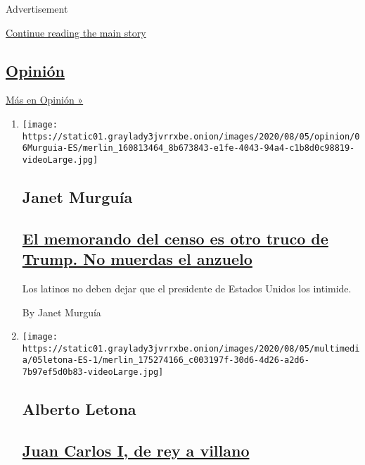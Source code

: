 Advertisement

\protect\hyperlink{after-mid1}{Continue reading the main story}

\hypertarget{opiniuxf3n}{%
\subsection{\texorpdfstring{\href{/es/section/opinion}{Opinión}}{Opinión}}\label{opiniuxf3n}}

\href{/es/section/opinion}{Más en Opinión »}

\begin{enumerate}
\def\labelenumi{\arabic{enumi}.}
\item
  \texttt{[image: https://static01.graylady3jvrrxbe.onion/images/2020/08/05/opinion/06Murguia-ES/merlin\_160813464\_8b673843-e1fe-4043-94a4-c1b8d0c98819-videoLarge.jpg]}

  \hypertarget{janet-murguuxeda}{%
  \subsection{Janet Murguía}\label{janet-murguuxeda}}

  \hypertarget{el-memorando-del-censo-es-otro-truco-de-trump-no-muerdas-el-anzuelo}{%
  \subsection{\texorpdfstring{\href{/es/2020/08/06/espanol/opinion/censo-inmigrantes-trump.html}{El
  memorando del censo es otro truco de Trump. No muerdas el
  anzuelo}}{El memorando del censo es otro truco de Trump. No muerdas el anzuelo}}\label{el-memorando-del-censo-es-otro-truco-de-trump-no-muerdas-el-anzuelo}}

  Los latinos no deben dejar que el presidente de Estados Unidos los
  intimide.

  By Janet Murguía
\item
  \texttt{[image: https://static01.graylady3jvrrxbe.onion/images/2020/08/05/multimedia/05letona-ES-1/merlin\_175274166\_c003197f-30d6-4d26-a2d6-7b97ef5d0b83-videoLarge.jpg]}

  \hypertarget{alberto-letona}{%
  \subsection{Alberto Letona}\label{alberto-letona}}

  \hypertarget{juan-carlos-i-de-rey-a-villano}{%
  \subsection{\texorpdfstring{\href{/es/2020/08/05/espanol/opinion/juan-carlos-exilio-espana.html}{Juan
  Carlos I, de rey a
  villano}}{Juan Carlos I, de rey a villano}}\label{juan-carlos-i-de-rey-a-villano}}


\end{enumerate}
